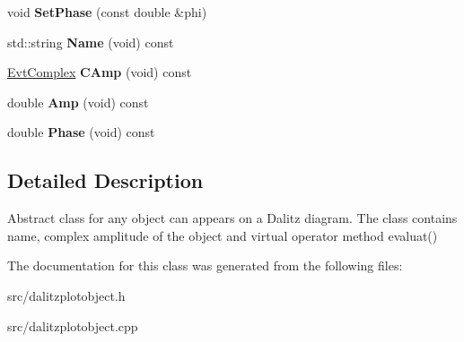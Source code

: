 \begin{DoxyCompactItemize}
\item 
\hypertarget{class_dalitz_plot_object_a4da12d56c5b38c32272522eeb97a2bd2}{}void {\bfseries Set\+Phase} (const double \&phi)\label{class_dalitz_plot_object_a4da12d56c5b38c32272522eeb97a2bd2}

\item 
\hypertarget{class_dalitz_plot_object_a9d4f85d319edf5698aa1b7f1489f13fe}{}std\+::string {\bfseries Name} (void) const \label{class_dalitz_plot_object_a9d4f85d319edf5698aa1b7f1489f13fe}

\item 
\hypertarget{class_dalitz_plot_object_ab892dcba314dcbf6357a8fe881d33aec}{}\hyperlink{class_evt_complex}{Evt\+Complex} {\bfseries C\+Amp} (void) const \label{class_dalitz_plot_object_ab892dcba314dcbf6357a8fe881d33aec}

\item 
\hypertarget{class_dalitz_plot_object_a3676ce93f75d9a453bef2b7af21db800}{}double {\bfseries Amp} (void) const \label{class_dalitz_plot_object_a3676ce93f75d9a453bef2b7af21db800}

\item 
\hypertarget{class_dalitz_plot_object_a8b3a7a006a1851c5dfe70863399fc8ef}{}double {\bfseries Phase} (void) const \label{class_dalitz_plot_object_a8b3a7a006a1851c5dfe70863399fc8ef}

\end{DoxyCompactItemize}


\subsection{Detailed Description}
Abstract class for any object can appears on a Dalitz diagram. The class contains name, complex amplitude of the object and virtual operator method evaluat() 

The documentation for this class was generated from the following files\+:\begin{DoxyCompactItemize}
\item 
src/dalitzplotobject.\+h\item 
src/dalitzplotobject.\+cpp\end{DoxyCompactItemize}
